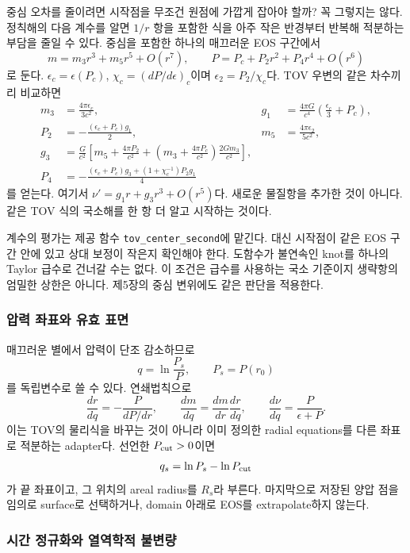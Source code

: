 \documentclass[
  10pt,
  a4paper,
]{article}
\begin{document}
중심 오차를 줄이려면 시작점을 무조건 원점에 가깝게 잡아야 할까? 꼭
그렇지는 않다. 정칙해의 다음 계수를 알면 \(1/r\) 항을 포함한 식을 아주
작은 반경부터 반복해 적분하는 부담을 줄일 수 있다. 중심을 포함한 하나의
매끄러운 EOS 구간에서 \[
m=m_3r^3+m_5r^5+O(r^7),\qquad
P=P_c+P_2r^2+P_4r^4+O(r^6)
\] 로 둔다. \(\epsilon_c=\epsilon(P_c)\),
\(\chi_c=(dP/d\epsilon)_c\)이며 \(\epsilon_2=P_2/\chi_c\)다. TOV 우변의
같은 차수끼리 비교하면 \[
\begin{aligned}
m_3&=\frac{4\pi\epsilon_c}{3c^2},&
g_1&=\frac{4\pi G}{c^4}\left(\frac{\epsilon_c}{3}+P_c\right),\\
P_2&=-\frac{(\epsilon_c+P_c)g_1}{2},&
m_5&=\frac{4\pi\epsilon_2}{5c^2},\\
g_3&=\frac{G}{c^2}\left[m_5+\frac{4\pi P_2}{c^2}
+\left(m_3+\frac{4\pi P_c}{c^2}\right)\frac{2Gm_3}{c^2}\right],\\
P_4&=-\frac{(\epsilon_c+P_c)g_3+(1+\chi_c^{-1})P_2g_1}{4}
\end{aligned}
\] 를 얻는다. 여기서 \(\nu'=g_1r+g_3r^3+O(r^5)\)다. 새로운 물질항을
추가한 것이 아니다. 같은 TOV 식의 국소해를 한 항 더 알고 시작하는
것이다.

계수의 평가는 제공 함수 \texttt{tov\_center\_second}에 맡긴다. 대신
시작점이 같은 EOS 구간 안에 있고 상대 보정이 작은지 확인해야 한다.
도함수가 불연속인 knot를 하나의 Taylor 급수로 건너갈 수는 없다. 이
조건은 급수를 사용하는 국소 기준이지 생략항의 엄밀한 상한은 아니다.
제5장의 중심 변위에도 같은 판단을 적용한다.

\subsubsection{압력 좌표와 유효
표면}\label{uxc555uxb825-uxc88cuxd45cuxc640-uxc720uxd6a8-uxd45cuxba74}

매끄러운 별에서 압력이 단조 감소하므로 \[
q=\ln\frac{P_s}{P},\qquad P_s=P(r_0)
\] 를 독립변수로 쓸 수 있다. 연쇄법칙으로 \[
\frac{dr}{dq}=-\frac{P}{dP/dr},\qquad
\frac{dm}{dq}=\frac{dm}{dr}\frac{dr}{dq},\qquad
\frac{d\nu}{dq}=\frac{P}{\epsilon+P}.
\] 이는 TOV의 물리식을 바꾸는 것이 아니라 이미 정의한 radial equations를
다른 좌표로 적분하는 adapter다. 선언한 \(P_{\rm cut}>0\)이면 \[
q_s=\ln P_s-\ln P_{\rm cut}
\] 가 끝 좌표이고, 그 위치의 areal radius를 \(R_s\)라 부른다. 마지막으로
저장된 양압 점을 임의로 surface로 선택하거나, domain 아래로 EOS를
extrapolate하지 않는다.

\subsubsection{시간 정규화와 열역학적
불변량}\label{uxc2dcuxac04-uxc815uxaddcuxd654uxc640-uxc5f4uxc5eduxd559uxc801-uxbd88uxbcc0uxb7c9}
\end{document}
